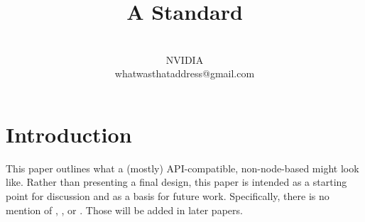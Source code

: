 \documentclass{article}
\begin{document}
\title{\textbf{\Large A Standard }}
\author{
  \\NVIDIA\\whatwasthataddress@gmail.com\\
}
\date{}
\maketitle


\section{Introduction}
\label{sec:intro}

This paper outlines what a (mostly) API-compatible, non-node-based
 might look like.  Rather than presenting a final design, this
paper is intended as a starting point for discussion and as a basis for future
work.  Specifically, there is no mention of , , or
.  Those will be added in later papers.




\end{document}
